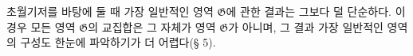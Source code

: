 
초월기저를 바탕에 둘 때 가장 일반적인 영역 $\mathfrak G$에 관한 결과는 그보다 덜 단순하다. 이 경우 모든 영역 $\mathfrak G$의 교집합은 그 자체가 영역 $\mathfrak G$가 아니며, 그 결과 가장 일반적인 영역의 구성도 한눈에 파악하기가 더 어렵다(§ 5).
